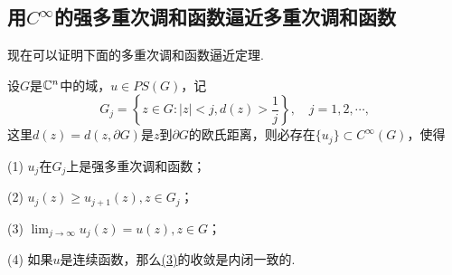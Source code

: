 \subsection{用$C^\infty$的强多重次调和函数逼近多重次调和函数}
现在可以证明下面的多重次调和函数逼近定理.
\begin{theorem}\label{thm5.4.8}
	设$G$是$\mathbb C^n$中的域，$u\in PS(G)$，记
	\[G_j=\left\{z\in G\colon |z|<j,d(z)>\frac1j\right\},\quad j=1,2,\cdots,\]
	这里$d(z)=d(z,\partial G)$是$z$到$\partial G$的欧氏距离，则必存在$\{u_j\}\subset C^\infty(G)$，使得
	
	(1)\hypertarget{5.4.8}{}
	$u_j$在$G_j$上是强多重次调和函数；
	
	(2)\hypertarget{5.4.8}{}
	$u_j(z)\ge u_{j+1}(z),z\in G_j$；
	
	(3)\hypertarget{5.4.8}{}
	$\lim_{j\to\infty} u_j(z)=u(z),z\in G$；
	
	(4)\hypertarget{5.4.8}{}
	如果$u$是连续函数，那么\hyperlink{5.4.8}{(3)}的收敛是内闭一致的.
\end{theorem}
